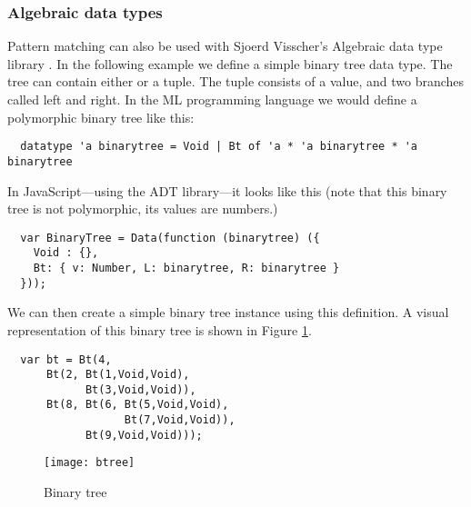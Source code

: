 \subsubsection{Algebraic data types}
Pattern matching can also be used with Sjoerd Visscher's Algebraic data type library \cite{visser08}. In the following example we define a simple binary tree data type. The tree can contain either  or a  tuple. The tuple consists of a value, and two branches called left and right. In the ML programming language we would define a polymorphic binary tree like this:
\begin{verbatim}
  datatype 'a binarytree = Void | Bt of 'a * 'a binarytree * 'a binarytree
\end{verbatim}
In JavaScript---using the ADT library---it looks like this (note that this binary tree is not polymorphic, its values are numbers.)
\begin{verbatim}
  var BinaryTree = Data(function (binarytree) ({
    Void : {},
    Bt: { v: Number, L: binarytree, R: binarytree }
  }));
\end{verbatim}
We can then create a simple binary tree instance using this definition. A visual representation of this binary tree is shown in Figure \ref{btree}. 
\begin{verbatim}
  var bt = Bt(4, 
      Bt(2, Bt(1,Void,Void), 
            Bt(3,Void,Void)), 
      Bt(8, Bt(6, Bt(5,Void,Void), 
                  Bt(7,Void,Void)), 
            Bt(9,Void,Void)));
\end{verbatim}

\begin{figure}[h!]
\centering
\texttt{[image: btree]}
\caption{Binary tree}
\label{btree}
\end{figure}

